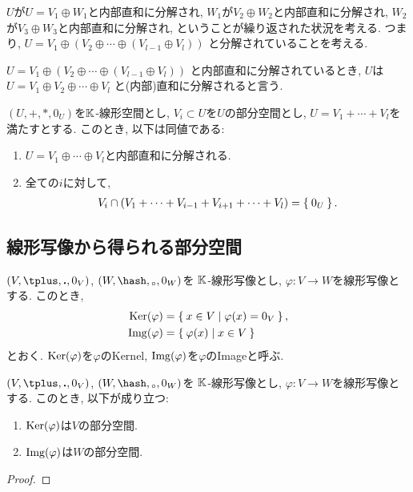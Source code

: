 $U$が$U=V_1\oplus W_1$と内部直和に分解され,
$W_1$が$V_2\oplus W_2$と内部直和に分解され,
$W_2$が$V_3\oplus W_3$と内部直和に分解され,
ということが繰り返された状況を考える.
つまり,
$U=V_1\oplus (V_2\oplus \cdots \oplus(V_{l-1}\oplus V_l))$
と分解されていることを考える.
\begin{definition}
$U=V_1\oplus (V_2\oplus \cdots \oplus(V_{l-1}\oplus V_l))$
と内部直和に分解されているとき,
$U$は$U=V_1\oplus V_2\oplus \cdots \oplus V_l$
と(内部)直和に分解されると言う.
\end{definition}
\begin{prop}
  $(U,\plus,\ast,0_U)$を$\mathbb{K}$-線形空間とし, $V_i\subset U$を$U$の部分空間とし,
  $U=V_1+\cdots+ V_l$を満たすとする.
  このとき, 以下は同値である:
  \begin{enumerate}
  \item $U=V_1\oplus \cdots \oplus V_l$と内部直和に分解される.
  \item 全ての$i$に対して,
    \begin{align*}
      V_i \cap (V_1+\cdots+ V_{i-1}+V_{i+1}+\cdots+ V_{l})=\Set{0_U}.
    \end{align*}
  \end{enumerate}
\end{prop}

\subsection{線形写像から得られる部分空間}

\begin{definition}
  $(V,\plus,\act,0_V)$,
  $(W,\pplus,\aact,0_W)$を
  $\mathbb{K}$-線形写像とし,
  $\varphi\colon V\to W$を線形写像とする.
  このとき,
  \begin{align*}
    \operatorname{Ker}(\varphi)&=\Set{x\in V|\varphi(x)=0_V  },\\
    \operatorname{Img}(\varphi)&=\Set{\varphi(x)|x\in V}
  \end{align*}
  とおく. $\operatorname{Ker}(\varphi)$を$\varphi$のKernel,
  $\operatorname{Img}(\varphi)$を$\varphi$のImageと呼ぶ.
\end{definition}
\begin{prop}
  $(V,\plus,\act,0_V)$,
  $(W,\pplus,\aact,0_W)$を
  $\mathbb{K}$-線形写像とし,
  $\varphi\colon V\to W$を線形写像とする.
このとき, 以下が成り立つ:
\begin{enumerate}
  \item $\operatorname{Ker}(\varphi)$は$V$の部分空間.
  \item $\operatorname{Img}(\varphi)$は$W$の部分空間.
\end{enumerate}
\end{prop}
\begin{proof}\end{proof}

